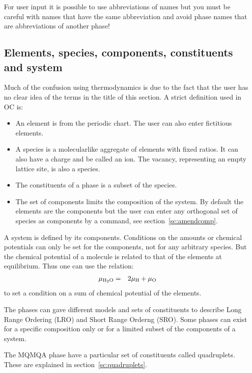 \documentclass[11pt]{article}
\begin{document}
For user input it is possible to use abbreviations of names but you
must be careful with names that have the same abbreviation and avoid
phase names that are abbreviations of another phase!

\hypertarget{Info elements}{}
\hypertarget{Info species}{}
\subsection{Elements, species, components, constituents and system}\label{sc:elements}

Much of the confusion using thermodynamics is due to the fact that the
user has no clear idea of the terms in the title of this section.  A
strict definition used in OC is:
\begin{itemize}
\item An element is from the periodic chart.  The user can also enter
  fictitious elements.
\item A species is a molecularlike aggregate of elements with fixed
  ratios.  It can also have a charge and be called an ion.  The
  vacancy, representing an empty lattice site, is also a species.
\item The constituents of a phase is a subset of the species.
\item The set of components limits the composition of the system.  By
  default the elements are the components but the user can enter any
  orthogonal set of species as components by a command, see
  section~\ref{sc:amendcomp}.
\end{itemize}

A system is defined by its components.  Conditions on the amounts or
chemical potentials can only be set for the components, not for any
arbitrary species.  But the chemical potential of a molecule is
related to that of the elements at equilibrium.  Thus one can use the
relation:
\begin{eqnarray}
\mu_{\rm H_2O} &=& 2\mu_{\rm H}+\mu_{\rm O}
\end{eqnarray}
to set a condition on a sum of chemical potential of the elements.

The phases can gave different models and sets of constituents to
describe Long Range Ordering (LRO) and Short Range Orderng (SRO).
Some phases can exist for a specific composition only or for a limited
subset of the components of a system.

The MQMQA phase have a particular set of constituents called
quadruplets.  These are explained in section~\ref{sc:quadruplets}.
\end{document}
